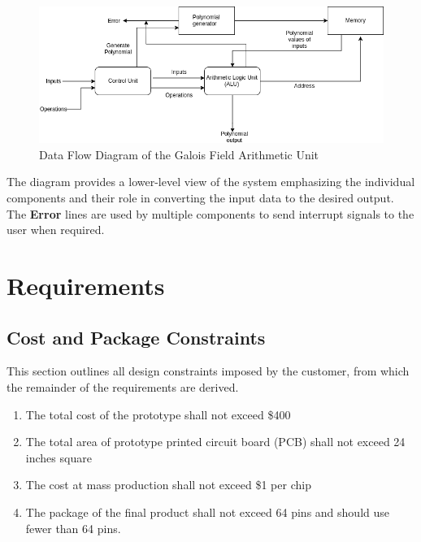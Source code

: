 \documentclass[12pt]{extarticle}
\newcommand{\team}{Galois Field Arithmetic Unit}
\begin{document}
        \begin{figure}[ht]
            \begin{center}
                \includegraphics[width=1\textwidth]{data_flow.png}
                \caption{Data Flow Diagram of the \team~} \label{fig:data_flow}
            \end{center}
        \end{figure}

        The diagram provides a lower-level view of the system emphasizing the
        individual components and their role in converting the input data to
        the desired output. The \textbf{Error} lines are used by multiple
        components to send interrupt signals to the user when required.

    \section{Requirements}

        \subsection{Cost and Package Constraints} This section outlines all
        design constraints imposed by the customer, from which the remainder of
        the requirements are derived.

        \begin{enumerate}

            \item The total cost of the prototype shall not exceed \$400
            
            \item The total area of prototype printed circuit board (PCB) shall
            not exceed 24 inches square
            
            \item The cost at mass production shall not exceed \$1 per chip
            
            \item The package of the final product shall not exceed 64 pins and
            should use fewer than 64 pins.

        \end{enumerate}
\end{document}
